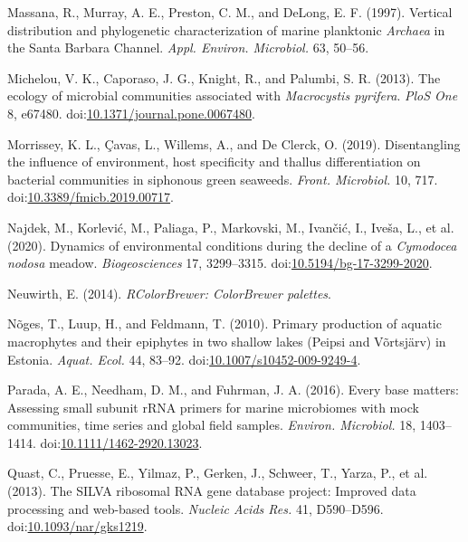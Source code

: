 \documentclass[12pt,]{article}
\begin{document}
\leavevmode\hypertarget{ref-Massana1997}{}%
Massana, R., Murray, A. E., Preston, C. M., and DeLong, E. F. (1997).
Vertical distribution and phylogenetic characterization of marine
planktonic \emph{Archaea} in the Santa Barbara Channel. \emph{Appl.
Environ. Microbiol.} 63, 50--56.

\leavevmode\hypertarget{ref-Michelou2013}{}%
Michelou, V. K., Caporaso, J. G., Knight, R., and Palumbi, S. R. (2013).
The ecology of microbial communities associated with \emph{Macrocystis
pyrifera}. \emph{PloS One} 8, e67480.
doi:\href{https://doi.org/10.1371/journal.pone.0067480}{10.1371/journal.pone.0067480}.

\leavevmode\hypertarget{ref-Morrissey2019}{}%
Morrissey, K. L., Çavas, L., Willems, A., and De Clerck, O. (2019).
Disentangling the influence of environment, host specificity and thallus
differentiation on bacterial communities in siphonous green seaweeds.
\emph{Front. Microbiol.} 10, 717.
doi:\href{https://doi.org/10.3389/fmicb.2019.00717}{10.3389/fmicb.2019.00717}.

\leavevmode\hypertarget{ref-Najdek2020}{}%
Najdek, M., Korlević, M., Paliaga, P., Markovski, M., Ivančić, I.,
Iveša, L., et al. (2020). Dynamics of environmental conditions during
the decline of a \emph{Cymodocea nodosa} meadow. \emph{Biogeosciences}
17, 3299--3315.
doi:\href{https://doi.org/10.5194/bg-17-3299-2020}{10.5194/bg-17-3299-2020}.

\leavevmode\hypertarget{ref-Neuwirth2014}{}%
Neuwirth, E. (2014). \emph{RColorBrewer: ColorBrewer palettes}.

\leavevmode\hypertarget{ref-Noges2010}{}%
Nõges, T., Luup, H., and Feldmann, T. (2010). Primary production of
aquatic macrophytes and their epiphytes in two shallow lakes (Peipsi and
Võrtsjärv) in Estonia. \emph{Aquat. Ecol.} 44, 83--92.
doi:\href{https://doi.org/10.1007/s10452-009-9249-4}{10.1007/s10452-009-9249-4}.

\leavevmode\hypertarget{ref-Parada2016}{}%
Parada, A. E., Needham, D. M., and Fuhrman, J. A. (2016). Every base
matters: Assessing small subunit rRNA primers for marine microbiomes
with mock communities, time series and global field samples.
\emph{Environ. Microbiol.} 18, 1403--1414.
doi:\href{https://doi.org/10.1111/1462-2920.13023}{10.1111/1462-2920.13023}.

\leavevmode\hypertarget{ref-Quast2013}{}%
Quast, C., Pruesse, E., Yilmaz, P., Gerken, J., Schweer, T., Yarza, P.,
et al. (2013). The SILVA ribosomal RNA gene database project: Improved
data processing and web-based tools. \emph{Nucleic Acids Res.} 41,
D590--D596.
doi:\href{https://doi.org/10.1093/nar/gks1219}{10.1093/nar/gks1219}.
\end{document}
